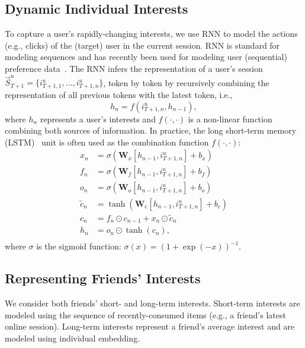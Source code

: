 \documentclass[sigconf]{acmart}
\begin{document}
\subsection{Dynamic Individual Interests} \label{sec:dynamic_individual_interests}
To capture a user's rapidly-changing interests, we use RNN to model the actions (e.g., clicks) of the (target) user in the current session.
RNN is standard for modeling sequences and has recently been used for modeling user (sequential) preference data~\cite{hidasi2016session}. The RNN infers the representation of a user's 
session $\vec{S}_{T+1}^u=\{i_{T+1,1}^{u},\ldots, i_{T+1,n}^{u}\}$, token by token by recursively combining the representation of all previous tokens with the latest token, i.e., 
\begin{equation}\label{eqt:rnn}
h_n = f(i_{T+1,n}^{u}, h_{n-1}),
\end{equation}
where $h_n$ represents a user's interests and $f(\cdot,\cdot)$ is a non-linear function combining both sources of information. In practice, the long short-term memory (LSTM)~\cite{hochreiter1997long} unit is often used as the combination function $f(\cdot,\cdot)$:
\begin{equation}
\label{eqt:lstm}
\begin{aligned}
x_n &= \sigma(\textbf{W}_x[h_{n-1}, i_{T+1,n}^{u}] + b_x)\\
f_n &= \sigma(\textbf{W}_f[h_{n-1}, i_{T+1,n}^{u}] + b_f)\\
o_n &= \sigma(\textbf{W}_o[h_{n-1}, i_{T+1,n}^{u}] + b_o)\\
\tilde{c}_n &= \tanh(\textbf{W}_c[h_{n-1}, i_{T+1,n}^{u}] + b_c)\\
c_n &= f_n \odot c_{n-1} + x_n \odot \tilde{c}_n\\
h_n &= o_n \odot \tanh(c_n),\\
\end{aligned}
\end{equation}
where $\sigma$ is the sigmoid function: $\sigma(x) =(1+\exp(-x))^{-1}$. 

\subsection{Representing Friends' Interests}
\label{sec:rep_of_friends}
We consider both friends' short- and long-term interests. 
Short-term interests are modeled using the sequence of recently-consumed items (e.g., a friend's latest online session).
Long-term interests represent a friend's average interest and are modeled using individual embedding.
\end{document}
